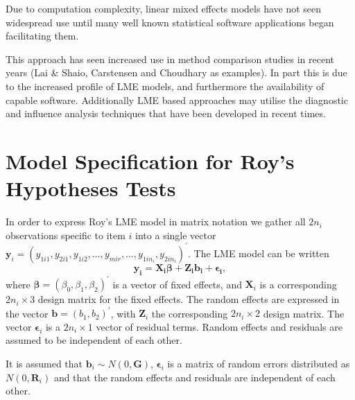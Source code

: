 \documentclass[12pt, a4paper]{report}
\theoremstyle{plain}
\theoremstyle{definition}
\theoremstyle{remark}
\begin{document}
Due to computation complexity, linear mixed effects models have not seen widespread use until many well known statistical software applications began facilitating them. 

This approach has seen increased use in method comparison studies in recent years (Lai \& Shaio, Carstensen and Choudhary as examples). In part this is due to the increased profile of LME models, and furthermore the availability of capable software. Additionally LME based approaches may utilise the diagnostic and influence analysis techniques that have been developed in recent times.




\section{Model Specification for Roy's Hypotheses Tests}

In order to express Roy's LME model in matrix notation we gather all $2n_i$ observations specific to item $i$ into a single vector  $\boldsymbol{y}_{i} = (y_{1i1},y_{2i1},y_{1i2},\ldots,y_{mir},\ldots,y_{1in_{i}},y_{2in_{i}})^\prime.$ The LME model can be written
\[
\boldsymbol{y_{i}} = \boldsymbol{X_{i}\beta} + \boldsymbol{Z_{i}b_{i}} + \boldsymbol{\epsilon_{i}},
\]
where $\boldsymbol{\beta}=(\beta_0,\beta_1,\beta_2)^\prime$ is a vector of fixed effects, and $\boldsymbol{X}_i$ is a corresponding $2n_i\times 3$ design matrix for the fixed effects. The random effects are expressed in the vector $\boldsymbol{b}=(b_1,b_2)^\prime$, with $\boldsymbol{Z}_i$ the corresponding $2n_i\times 2$ design matrix. The vector $\boldsymbol{\epsilon}_i$ is a $2n_i\times 1$ vector of residual terms. Random effects and residuals are assumed to be independent of each other.

It is assumed that $\boldsymbol{b}_i \sim N(0,\boldsymbol{G})$, $\boldsymbol{\epsilon}_i$ is a matrix of random errors distributed as $N(0,\boldsymbol{R}_i)$ and that the random effects and residuals are 
independent of each other.
\end{document}
